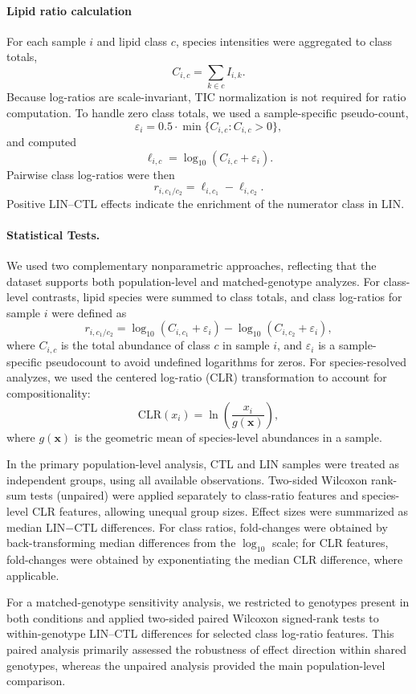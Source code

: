 \documentclass[9pt,twocolumn,twoside]{rilabRxiv}
\begin{document}
\paragraph{Lipid ratio calculation}
For each sample $i$ and lipid class $c$, species intensities were aggregated to class totals,
\[
C_{i,c}=\sum_{k \in c} I_{i,k}.
\]
Because log-ratios are scale-invariant, TIC normalization is not required for ratio computation.
To handle zero class totals, we used a sample-specific pseudo-count,
\[
\varepsilon_i=0.5 \cdot \min\{C_{i,c} : C_{i,c}>0\},
\]
and computed
\[
\ell_{i,c}=\log_{10}(C_{i,c}+\varepsilon_i).
\]
Pairwise class log-ratios were then
\[
r_{i,c_1/c_2}=\ell_{i,c_1}-\ell_{i,c_2}.
\]
Positive LIN--CTL effects indicate the enrichment of the numerator class in LIN.


\paragraph{Statistical Tests.}
We used two complementary nonparametric approaches, reflecting that the dataset supports both population-level and matched-genotype analyzes. For class-level contrasts, lipid species were summed to class totals, and class log-ratios for sample \(i\) were defined as
\[
r_{i,c_1/c_2}=\log_{10}(C_{i,c_1}+\varepsilon_i)-\log_{10}(C_{i,c_2}+\varepsilon_i),
\]
where \(C_{i,c}\) is the total abundance of class \(c\) in sample \(i\), and \(\varepsilon_i\) is a sample-specific pseudocount to avoid undefined logarithms for zeros. For species-resolved analyzes, we used the centered log-ratio (CLR) transformation to account for compositionality:
\[
\mathrm{CLR}(x_i)=\ln\!\left(\frac{x_i}{g(\mathbf{x})}\right),
\]
where \(g(\mathbf{x})\) is the geometric mean of species-level abundances in a sample.

In the primary population-level analysis, CTL and LIN samples were treated as independent groups, using all available observations. Two-sided Wilcoxon rank-sum tests (unpaired) were applied separately to class-ratio features and species-level CLR features, allowing unequal group sizes. Effect sizes were summarized as median LIN\(-\)CTL differences. For class ratios, fold-changes were obtained by back-transforming median differences from the \(\log_{10}\) scale; for CLR features, fold-changes were obtained by exponentiating the median CLR difference, where applicable.

For a matched-genotype sensitivity analysis, we restricted to genotypes present in both conditions and applied two-sided paired Wilcoxon signed-rank tests to within-genotype LIN--CTL differences for selected class log-ratio features. This paired analysis primarily assessed the robustness of effect direction within shared genotypes, whereas the unpaired analysis provided the main population-level comparison.
\end{document}
